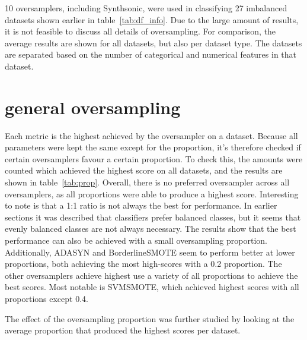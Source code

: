 
10 oversamplers, including Synthsonic, were used in classifying 27 imbalanced datasets shown earlier in table~\ref{tab:df_info}. Due to the large amount of results, it is not feasible to discuss all details of oversampling. For comparison, the average results are shown for all datasets, but also per dataset type. The datasets are separated based on the number of categorical and numerical features in that dataset.

\section{general oversampling}
Each metric is the highest achieved by the oversampler on a dataset. Because all parameters were kept the same except for the proportion, it's therefore checked if certain oversamplers favour a certain proportion. To check this, the amounts were counted which achieved the highest score on all datasets, and the results are shown in table~\ref{tab:prop}. Overall, there is no preferred oversampler across all oversamplers, as all proportions were able to produce a highest score. Interesting to note is that a 1:1 ratio is not always the best for performance. In earlier sections it was described that classifiers prefer balanced classes, but it seems that evenly balanced classes are not always necessary. The results show that the best performance can also be achieved with a small oversampling proportion. Additionally, ADASYN and BorderlineSMOTE seem to perform better at lower proportions, both achieving the most high-scores with a 0.2 proportion. The other oversamplers achieve highest use a variety of all proportions to achieve the best scores. Most notable is SVMSMOTE, which achieved highest scores with all proportions except 0.4. 

The effect of the oversampling proportion was further studied by looking at the average proportion that produced the highest scores per dataset. 

